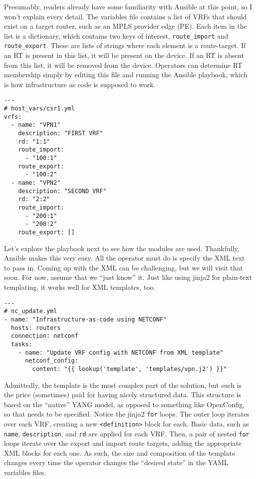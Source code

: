 Presumably, readers already have some familiarity with Ansible at this point, so
I won't explain every detail. The variables file contains a list of VRFs that
should exist on a target router, such as an MPLS provider edge (PE). Each item
in the list is a dictionary, which contains two keys of interest,
\verb|route_import| and \verb|route_export|. These are lists of strings where
each element is a route-target. If an RT is present in this list, it will be
present on the device. If an RT is absent from this list, it will be removed
from the device. Operators can determine RT membership simply by editing this
file and running the Ansible playbook, which is how infrastructure as code
is supposed to work.

\begin{verbatim}
---
# host_vars/csr1.yml
vrfs:
  - name: "VPN1"
    description: "FIRST VRF"
    rd: "1:1"
    route_import:
      - "100:1"
    route_export:
      - "100:2"
  - name: "VPN2"
    description: "SECOND VRF"
    rd: "2:2"
    route_import:
      - "200:1"
      - "200:2"
    route_export: []
\end{verbatim}

Let's explore the playbook next to see how the modules are used. Thankfully,
Ansible makes this very easy. All the operator must do is specify the XML
text to pass in. Coming up with the XML can be challenging, but we will visit
that soon. For now, assume that we ``just know'' it. Just like using jinja2 for
plain-text templating, it works well for XML templates, too.

\begin{verbatim}
---
# nc_update.yml
- name: "Infrastructure-as-code using NETCONF"
  hosts: routers
  connection: netconf
  tasks:
    - name: "Update VRF config with NETCONF from XML template"
      netconf_config:
        content: "{{ lookup('template', 'templates/vpn.j2') }}"
\end{verbatim}

Admittedly, the template is the most complex part of the solution, but such is
the price (sometimes) paid for having nicely structured data. This structure
is based on the ``native'' YANG model, as opposed to something like OpenConfig,
so that needs to be specified. Notice the jinja2 \verb|for| loops. The outer
loop iterates over each VRF, creating a new \verb|<definition>| block for each.
Basic data, such as \verb|name|, \verb|description|, and \verb|rd| are applied
for each VRF\@. Then, a pair of nested \verb|for| loops iterate over the export
and import route targets, adding the appropriate XML blocks for each one. As
such, the size and composition of the template changes every time the operator
changes the ``desired state'' in the YAML variables files.

